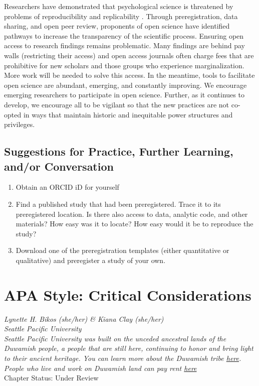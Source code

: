 \documentclass[
  11pt,
]{book}
\providecommand{\tightlist}{%
  \setlength{\itemsep}{0pt}\setlength{\parskip}{0pt}}
\begin{document}
Researchers have demonstrated that psychological science is threatened by problems of reproducibility and replicability \citep{open_science_collaboration_estimating_2015}. Through preregistration, data sharing, and open peer review, proponents of open science have identified pathways to increase the transparency of the scientific process. Ensuring open access to research findings remains problematic. Many findings are behind pay walls (restricting their access) and open access journals often charge fees that are prohibitive for new scholars and those groups who experience marginalization. More work will be needed to solve this access. In the meantime, tools to facilitate open science are abundant, emerging, and constantly improving. We encourage emerging researchers to participate in open science. Further, as it continues to develop, we encourage all to be vigilant so that the new practices are not co-opted in ways that maintain historic and inequitable power structures and privileges.

\section{Suggestions for Practice, Further Learning, and/or Conversation}\label{suggestions-for-practice-further-learning-andor-conversation-2}

\begin{enumerate}
\def\labelenumi{\arabic{enumi}.}
\tightlist
\item
  Obtain an ORCID iD for yourself
\item
  Find a published study that had been preregistered. Trace it to its preregistered location. Is there also access to data, analytic code, and other materials? How easy was it to locate? How easy would it be to reproduce the study?
\item
  Download one of the preregistration templates (either quantitative or qualitative) and preregister a study of your own.
\end{enumerate}

\chapter{APA Style: Critical Considerations}\label{APAstyle}

\emph{Lynette H. Bikos (she/her) \& Kiana Clay (she/her)}\\
\emph{Seattle Pacific University}\\
\emph{Seattle Pacific University was built on the unceded ancestral lands of the Duwamish people, a people that are still here, continuing to honor and bring light to their ancient heritage. You can learn more about the Duwamish tribe \href{https://www.duwamishtribe.org/}{here}. People who live and work on Duwamish land can pay rent \href{https://www.realrentduwamish.org/}{here}}\\
Chapter Status: Under Review
\end{document}
